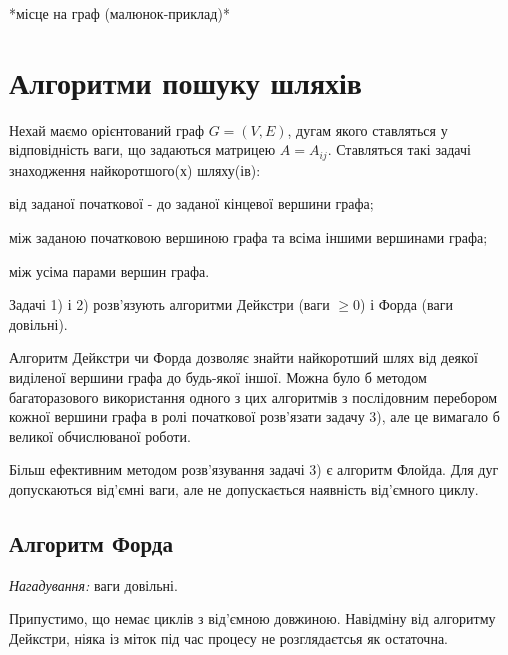 \documentclass[12pt,a4paper]{book}
\newenvironment{slim_enumerate}{
\begin{enumerate}
  \setlength{\itemsep}{1pt}
  \setlength{\parskip}{0pt}
  \setlength{\parsep}{0pt}}
{\end{enumerate}}
\begin{document}
*місце на граф (малюнок-приклад)*

\chapter{Алгоритми пошуку шляхів}

Нехай маємо орієнтований граф $G=(V,E)$, дугам якого ставляться у відповідність ваги, що задаються матрицею $A=A_{ij}$. Ставляться такі задачі знаходження найкоротшого(х) шляху(ів):
\begin{slim_enumerate}
  \item від заданої початкової - до заданої кінцевої вершини графа;
  \item між заданою початковою вершиною графа та всіма іншими вершинами графа;
  \item між усіма парами вершин графа.
\end{slim_enumerate}
Задачі 1) і 2) розв’язують алгоритми Дейкстри (ваги $\geq 0$) і Форда (ваги довільні).

Алгоритм Дейкстри чи Форда дозволяє знайти найкоротший шлях від деякої виділеної вершини графа до будь-якої іншої. Можна було б методом багаторазового використання одного з цих алгоритмів з послідовним перебором кожної вершини графа в ролі початкової розв’язати задачу 3), але це вимагало б великої обчислюваної роботи.

Більш ефективним методом розв’язування задачі 3) є алгоритм Флойда. Для дуг допускаються від’ємні ваги, але не допускається наявність від’ємного циклу.

\section{Алгоритм Форда}

\emph{Нагадування:} ваги довільні.

Припустимо, що немає циклів з від’ємною довжиною. Навідміну від алгоритму Дейкстри, ніяка із міток під час процесу не розглядаєтсья як остаточна.
\end{document}
